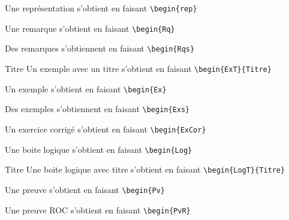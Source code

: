 \begin{pageCours}
\begin{Rep}
Une représentation s'obtient en faisant \verb|\begin{rep}|
\end{Rep}

\begin{Rq}
Une remarque s'obtient en faisant \verb|\begin{Rq}|
\end{Rq}

\begin{Rqs}
Des remarques s'obtiennent en faisant \verb|\begin{Rqs}|
\end{Rqs}

\begin{ExT}{Titre}
Un exemple avec un titre s'obtient en faisant \verb|\begin{ExT}{Titre}|
\end{ExT}

\begin{Ex}
Un exemple s'obtient en faisant \verb|\begin{Ex}|
\end{Ex}

\begin{Exs}
Des exemples s'obtiennent en faisant \verb|\begin{Exs}|
\end{Exs}

\begin{ExCor}
Un exercice corrigé s'obtient en faisant \verb|\begin{ExCor}|
\end{ExCor}

\begin{Log}
Une boite logique s'obtient en faisant \verb|\begin{Log}|
\end{Log}

\begin{LogT}{Titre}
Une boite logique avec titre s'obtient en faisant \verb|\begin{LogT}{Titre}|
\end{LogT}

\begin{Pv}
Une preuve s'obtient en faisant \verb|\begin{Pv}|
\end{Pv}

\begin{PvR}
Une preuve ROC s'obtient en faisant \verb|\begin{PvR}|
\end{PvR}


\end{pageCours}
